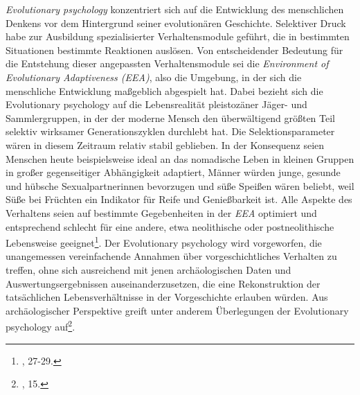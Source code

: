 \documentclass[openany,twoside,twocolumn]{book}
\let\rmarkdownfootnote\footnote%
\def\footnote{\protect\rmarkdownfootnote}
\begin{document}
\emph{Evolutionary psychology} konzentriert sich auf die Entwicklung des
menschlichen Denkens vor dem Hintergrund seiner evolutionären
Geschichte. Selektiver Druck habe zur Ausbildung spezialisierter
Verhaltensmodule geführt, die in bestimmten Situationen bestimmte
Reaktionen auslösen. Von entscheidender Bedeutung für die Entstehung
dieser angepassten Verhaltensmodule sei die \emph{Environment of
Evolutionary Adaptiveness (EEA)}, also die Umgebung, in der sich die
menschliche Entwicklung maßgeblich abgespielt hat. Dabei bezieht sich
die Evolutionary psychology auf die Lebensrealität pleistozäner Jäger-
und Sammlergruppen, in der der moderne Mensch den überwältigend größten
Teil selektiv wirksamer Generationszyklen durchlebt hat. Die
Selektionsparameter wären in diesem Zeitraum relativ stabil geblieben.
In der Konsequenz seien Menschen heute beispielsweise ideal an das
nomadische Leben in kleinen Gruppen in großer gegenseitiger Abhängigkeit
adaptiert, Männer würden junge, gesunde und hübsche Sexualpartnerinnen
bevorzugen und süße Speißen wären beliebt, weil Süße bei Früchten ein
Indikator für Reife und Genießbarkeit ist. Alle Aspekte des Verhaltens
seien auf bestimmte Gegebenheiten in der \emph{EEA} optimiert und
entsprechend schlecht für eine andere, etwa neolithische oder
postneolithische Lebensweise geeignet\footnote{\textcite{SmithThreestylesevolutionary2000},
  27-29.}. Der Evolutionary psychology wird vorgeworfen, die
unangemessen vereinfachende Annahmen über vorgeschichtliches Verhalten
zu treffen, ohne sich ausreichend mit jenen archäologischen Daten und
Auswertungsergebnissen auseinanderzusetzen, die eine Rekonstruktion der
tatsächlichen Lebensverhältnisse in der Vorgeschichte erlauben würden.
Aus archäologischer Perspektive greift unter anderem
\textcite{Mithenprehistorymindsearch1996} Überlegungen der Evolutionary
psychology auf\footnote{\textcite{ShennanGenesmemeshuman2002}, 15.}.
\end{document}

